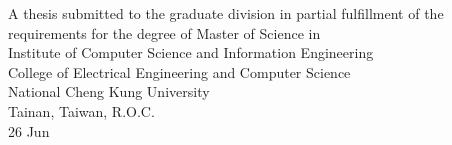 
\singlespacing
\newpage
{}
\thispagestyle{empty}
\begin{center}

\begin{minipage}[c][3.5cm][t]{\textwidth}
  \begin{center}
    \vspace{0.4cm}


    \vspace{0.5cm}


    \vspace{0.5cm}

  \end{center}
\end{minipage}

\vspace{1.2cm}


\begin{minipage}[c][5cm][t]{\textwidth}
  \begin{center}\Large A thesis submitted to the graduate division in partial fulfillment
  of the requirements for the degree of Master of Science in\\
  Institute of Computer Science and Information Engineering\\ %
  College of Electrical Engineering and Computer Science\\ %
  National Cheng Kung University\\ %
  Tainan, Taiwan, R.O.C.\\
  \vspace{0.1cm}
  26 \thinspace \thinspace Jun \thinspace {}
  \end{center}
\end{minipage}


\end{center}
